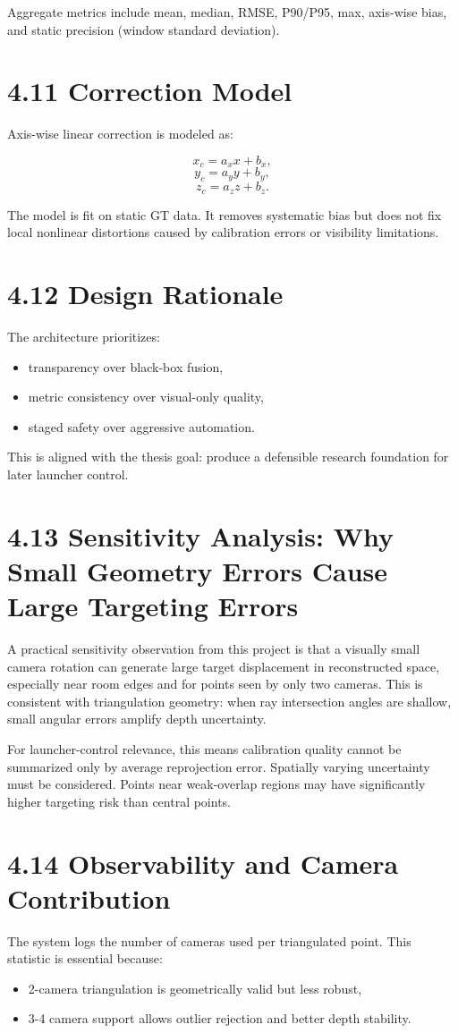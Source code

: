Aggregate metrics include mean, median, RMSE, P90/P95, max, axis-wise bias, and static precision (window standard deviation).

\section{4.11 Correction Model}
Axis-wise linear correction is modeled as:

\[
x_c = a_x x + b_x,
\]
\[
y_c = a_y y + b_y,
\]
\[
z_c = a_z z + b_z.
\]

The model is fit on static GT data. It removes systematic bias but does not fix local nonlinear distortions caused by calibration errors or visibility limitations.

\section{4.12 Design Rationale}
The architecture prioritizes:
\begin{itemize}
  \item transparency over black-box fusion,
  \item metric consistency over visual-only quality,
  \item staged safety over aggressive automation.
\end{itemize}

This is aligned with the thesis goal: produce a defensible research foundation for later launcher control.


\section{4.13 Sensitivity Analysis: Why Small Geometry Errors Cause Large Targeting Errors}
A practical sensitivity observation from this project is that a visually small camera rotation can generate large target displacement in reconstructed space, especially near room edges and for points seen by only two cameras. This is consistent with triangulation geometry: when ray intersection angles are shallow, small angular errors amplify depth uncertainty.

For launcher-control relevance, this means calibration quality cannot be summarized only by average reprojection error. Spatially varying uncertainty must be considered. Points near weak-overlap regions may have significantly higher targeting risk than central points.

\section{4.14 Observability and Camera Contribution}
The system logs the number of cameras used per triangulated point. This statistic is essential because:
\begin{itemize}
  \item 2-camera triangulation is geometrically valid but less robust,
  \item 3-4 camera support allows outlier rejection and better depth stability.
\end{itemize}

